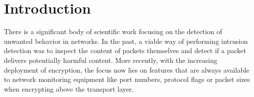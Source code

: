 \documentclass[conference]{IEEEtran}
\begin{document}

\maketitle

\section{Introduction}
\label{sec:introduction}

There is a significant body of scientific work focusing on the detection of unwanted behavior in networks. In the past, a viable way of performing intrusion detection was to inspect the content of packets themselves and detect if a packet delivers potentially harmful content. More recently, with the increasing deployment of encryption, the focus now lies on features that are always available to network monitoring equipment like port numbers, protocol flags or packet sizes when encrypting above the transport layer.

\end{document}
